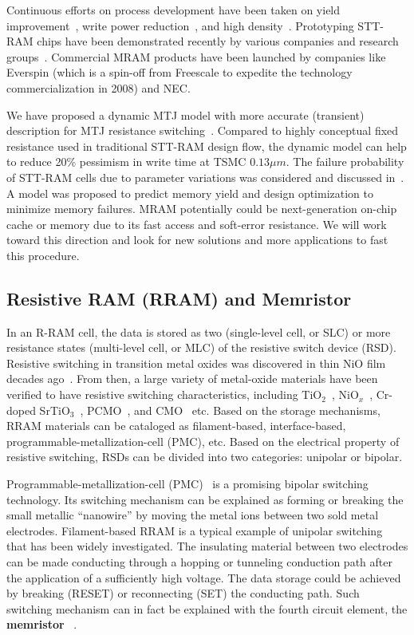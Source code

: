 Continuous efforts on process development have been taken on yield improvement~\cite{Miura07}, write power reduction~\cite{Durlam03}, and high density~\cite{Lou08}. Prototyping STT-RAM chips have been demonstrated recently by various companies and research groups~\cite{Hosomi05,Kawahara07,Nebashi09,Motoyoshi04,Andre05,Kawahara08}. Commercial MRAM products have been launched by companies like Everspin (which is a spin-off from Freescale to expedite the technology commercialization in 2008) and NEC.

We have proposed a dynamic MTJ model with more accurate (transient) description for MTJ resistance switching~\cite{Chen08}. Compared to highly conceptual fixed resistance used in traditional STT-RAM design flow, the dynamic model can help to reduce 20\% pessimism in write time at TSMC $0.13{\mu}m$. The failure probability of STT-RAM cells due to parameter variations was considered and discussed in~\cite{Li09}. A model was proposed to predict memory yield and design optimization to minimize memory failures. MRAM potentially could be next-generation on-chip cache or memory due to its fast access and soft-error resistance. We will work toward this direction and look for new solutions and more applications to fast this procedure.

\subsection{Resistive RAM (RRAM) and Memristor}
In an R-RAM cell, the data is stored as two (single-level cell, or SLC) or more resistance states (multi-level cell, or MLC) of the resistive switch device (RSD). Resistive switching in transition metal oxides was discovered in thin NiO film decades ago~\cite{Gibbons64}. From then, a large variety of metal-oxide materials have been verified to have resistive switching characteristics, including TiO$_2$~\cite{Fujimoto06}, NiO$_x$~\cite{Jung07}, Cr-doped SrTiO$_3$~\cite{Janousch07}, PCMO~\cite{Liu00}, and CMO~\cite{Hsu07} etc. Based on the storage mechanisms, RRAM materials can be cataloged as filament-based, interface-based, programmable-metallization-cell (PMC), etc. Based on the electrical property of resistive switching, RSDs can be divided into two categories: unipolar or bipolar.

Programmable-metallization-cell (PMC)~\cite{Kozicki05} is a promising bipolar switching technology. Its switching mechanism can be explained as forming or breaking the small metallic ``nanowire'' by moving the  metal ions between two sold metal electrodes. Filament-based RRAM is a typical example of unipolar switching~\cite{Inoue} that has been widely investigated. The insulating material between two electrodes can be made conducting through a hopping or tunneling conduction path after the application of a sufficiently high voltage. The data storage could be achieved by breaking (RESET) or reconnecting (SET) the conducting path. Such switching mechanism can in fact be explained with the fourth circuit element, the \textbf{memristor} ~\cite{Chua71,Tour08,Strukov08}.


